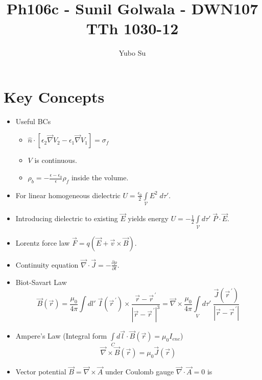 \documentclass[10pt]{report}
\newcommand{\pd}[2]{\frac{\partial #1}{\partial#2}}
\newcommand{\pvec}[1]{\vec{#1}^{\,\prime}}
\newcommand{\abs}[1]{\left|#1\right|}
\begin{document}
\pagestyle{fancy}

\title{Ph106c - Sunil Golwala - DWN107 TTh 1030-12}
\author{Yubo Su}
\date{ }

\maketitle

\tableofcontents

\chapter{Key Concepts}

\begin{itemize}
    \item Useful BCs
        \begin{itemize}
            \item $\hat{n}\cdot \left[ \epsilon_2\vec{\nabla}V_2 - \epsilon_1\vec{\nabla}V_1 \right] = \sigma_f$
            \item $V$ is continuous.
            \item $\rho_b= -\frac{\epsilon - \epsilon_0}{\epsilon}\rho_f$ inside the volume.
        \end{itemize}
    \item For linear homogeneous dielectric $U = \frac{\epsilon_0}{2}\int\limits_{\mathcal{V}}^{}E^2\;d\tau'$.
    \item Introducing dielectric to existing $\vec{E}$ yields energy $U = -\frac{1}{2}\int\limits_{\mathcal{V}}^{}d\tau'\;\vec{P}\cdot \vec{E}$.
    \item Lorentz force law $\vec{F} = q(\vec{E} + \vec{v}\times \vec{B})$.
    \item Continuity equation $\vec{\nabla}\cdot\vec{J} = -\pd{\rho}{t}$.
    \item Biot-Savart Law 
        $$\vec{B}(\vec{r}) = \frac{\mu_0}{4\pi}\int\limits_{}^{}dl'\;\vec{I}(\pvec{r}) \times \frac{\vec{r} - \pvec{r}}{\abs{\vec{r} - \pvec{r}}^3} = \vec{\nabla} \times \frac{\mu_0}{4\pi}\int\limits_{V}^{}d\tau'\;\frac{\vec{J}(\pvec{r})}{\abs{\vec{r} - \pvec{r}}}$$
    \item Ampere's Law (Integral form $\int\limits_{C}^{}d\vec{l}\cdot\vec{B}(\vec{r}) = \mu_0 I_{enc}$)
        $$\vec{\nabla}\times\vec{B}(\vec{r}) = \mu_0\vec{J}(\vec{r})$$
    \item Vector potential $\vec{B} = \vec{\nabla} \times \vec{A}$ under Coulomb gauge $\vec{\nabla}\cdot\vec{A} = 0$ is

\end{itemize}
\end{document}
